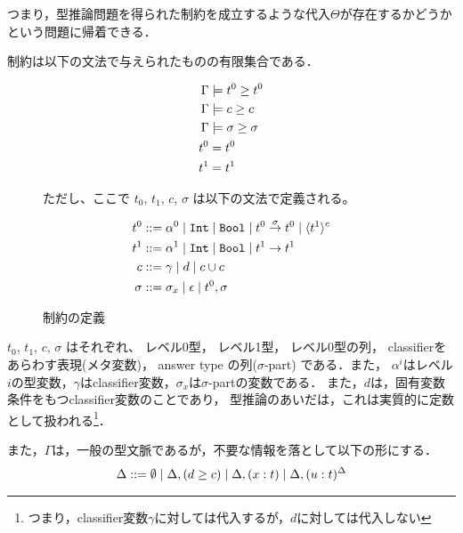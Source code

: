 つまり，型推論問題を得られた制約を成立するような代入$\Theta$が存在するかどうかという問題に帰着できる．

制約は以下の文法で与えられたものの有限集合である．

\begin{figure}[H]
  \centering
  \begin{align*}
    \Gamma &\models {t^0} \ge {t^0} \\
    \Gamma &\models {c} \ge {c} \\
    \Gamma &\models {\sigma} \ge {\sigma} \\
    t^0 &= t^0 \\
    t^1 &= t^1
  \end{align*}

  ただし、ここで $t_0$, $t_1$, $c$, $\sigma$ は以下の文法で定義される。

  \begin{align*}
    t^0      & ::= \alpha^0 \mid \mbox{\texttt{Int}} \mid \mbox{\texttt{Bool}} \mid {t^0} \stackrel{\sigma}{\rightarrow} {t^0} \mid \langle{t^1}\rangle^{c} \\
    t^1      & ::= \alpha^1 \mid \mbox{\texttt{Int}} \mid \mbox{\texttt{Bool}} \mid {t^1} \stackrel{}{\rightarrow} {t^1} \\
    c        & ::= \gamma \mid d \mid c \cup c \\
    \sigma   & ::= \sigma_x \mid \epsilon \mid t^0, \sigma
  \end{align*}

  \caption{制約の定義}
  \label{fig:constr_def}
\end{figure}

$t_0$, $t_1$, $c$, $\sigma$ はそれぞれ、
レベル0型，
レベル1型，
レベル0型の列，
classifierをあらわす表現(メタ変数)，
answer type の列($\sigma$-part)
である．また，
$\alpha^i$はレベル$i$の型変数，$\gamma$はclassifier変数，$\sigma_x$は$\sigma$-partの変数である．
また，$d$は，固有変数条件をもつclassifier変数のことであり，
型推論のあいだは，これは実質的に定数として扱われる\footnote{つまり，classifier変数$\gamma$に対しては代入するが，$d$に対しては代入しない}．

また，$\Gamma$は，一般の型文脈であるが，不要な情報を落として以下の形にする．
\begin{align*}
  \Delta ::= \emptyset
  \mid \Delta, ({d} \ge {c})
  \mid \Delta, (x : t)
  \mid \Delta, (u : t)^{\Delta}
\end{align*}


